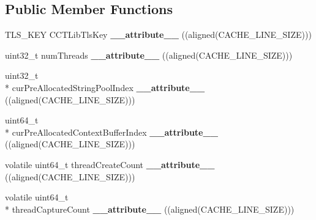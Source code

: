 \subsection*{Public Member Functions}
\begin{DoxyCompactItemize}
\item 
\hypertarget{structPinCCTLib_1_1CCT__LIB__GLOBAL__STATE_aa3db9fa56c4347861a13e9f635533fe9}{T\-L\-S\-\_\-\-K\-E\-Y C\-C\-T\-Lib\-Tls\-Key {\bfseries \-\_\-\-\_\-attribute\-\_\-\-\_\-} ((aligned(C\-A\-C\-H\-E\-\_\-\-L\-I\-N\-E\-\_\-\-S\-I\-Z\-E)))}\label{structPinCCTLib_1_1CCT__LIB__GLOBAL__STATE_aa3db9fa56c4347861a13e9f635533fe9}

\item 
\hypertarget{structPinCCTLib_1_1CCT__LIB__GLOBAL__STATE_a4dbfd1f07fbe66037941bde8a5c2b8d5}{uint32\-\_\-t num\-Threads {\bfseries \-\_\-\-\_\-attribute\-\_\-\-\_\-} ((aligned(C\-A\-C\-H\-E\-\_\-\-L\-I\-N\-E\-\_\-\-S\-I\-Z\-E)))}\label{structPinCCTLib_1_1CCT__LIB__GLOBAL__STATE_a4dbfd1f07fbe66037941bde8a5c2b8d5}

\item 
\hypertarget{structPinCCTLib_1_1CCT__LIB__GLOBAL__STATE_a59c2d680b535543506c419e50b6f7914}{uint32\-\_\-t \\*
cur\-Pre\-Allocated\-String\-Pool\-Index {\bfseries \-\_\-\-\_\-attribute\-\_\-\-\_\-} ((aligned(C\-A\-C\-H\-E\-\_\-\-L\-I\-N\-E\-\_\-\-S\-I\-Z\-E)))}\label{structPinCCTLib_1_1CCT__LIB__GLOBAL__STATE_a59c2d680b535543506c419e50b6f7914}

\item 
\hypertarget{structPinCCTLib_1_1CCT__LIB__GLOBAL__STATE_ae57dbd59c4464bc429fed8db25fb1206}{uint64\-\_\-t \\*
cur\-Pre\-Allocated\-Context\-Buffer\-Index {\bfseries \-\_\-\-\_\-attribute\-\_\-\-\_\-} ((aligned(C\-A\-C\-H\-E\-\_\-\-L\-I\-N\-E\-\_\-\-S\-I\-Z\-E)))}\label{structPinCCTLib_1_1CCT__LIB__GLOBAL__STATE_ae57dbd59c4464bc429fed8db25fb1206}

\item 
\hypertarget{structPinCCTLib_1_1CCT__LIB__GLOBAL__STATE_a4371445089cf7f6daccb8e79f32b0780}{volatile uint64\-\_\-t thread\-Create\-Count {\bfseries \-\_\-\-\_\-attribute\-\_\-\-\_\-} ((aligned(C\-A\-C\-H\-E\-\_\-\-L\-I\-N\-E\-\_\-\-S\-I\-Z\-E)))}\label{structPinCCTLib_1_1CCT__LIB__GLOBAL__STATE_a4371445089cf7f6daccb8e79f32b0780}

\item 
\hypertarget{structPinCCTLib_1_1CCT__LIB__GLOBAL__STATE_a608d22bf62a2413d2c6f52803fbc7535}{volatile uint64\-\_\-t \\*
thread\-Capture\-Count {\bfseries \-\_\-\-\_\-attribute\-\_\-\-\_\-} ((aligned(C\-A\-C\-H\-E\-\_\-\-L\-I\-N\-E\-\_\-\-S\-I\-Z\-E)))}\label{structPinCCTLib_1_1CCT__LIB__GLOBAL__STATE_a608d22bf62a2413d2c6f52803fbc7535}


\end{DoxyCompactItemize}
